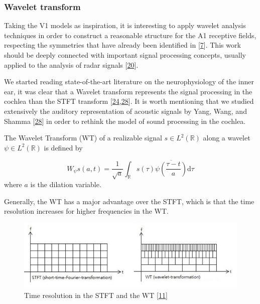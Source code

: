 \documentclass[
  american,
]{article}
\begin{document}
\hypertarget{wavelet-transform}{%
\subsubsection{Wavelet transform}\label{wavelet-transform}}

Taking the V1 models as inspiration, it is interesting to apply wavelet analysis techniques
in order to construct a reasonable structure for the A1 receptive fields,
respecting the symmetries that have already been identified in {[}\protect\hyperlink{ref-boscain2021}{7}{]}.
This work should be deeply connected with important signal processing concepts,
usually applied to the analysis of radar signals {[}\protect\hyperlink{ref-mann1992}{20}{]}.

We started reading state-of-the-art literature on the neurophysiology of the inner ear,
it was clear that a Wavelet transform represents the signal processing
in the cochlea than the STFT transform {[}\protect\hyperlink{ref-reimann2011}{24},\protect\hyperlink{ref-yang1992}{28}{]}.
It is worth mentioning that we studied extensively the auditory representation
of acoustic signals by Yang, Wang, and Shamma {[}\protect\hyperlink{ref-yang1992}{28}{]} in order
to rethink the model of sound processing in the cochlea.

The Wavelet Transform (WT) of a realizable signal \(s\in L^2(\mathbb{R})\) along
a wavelet \(\psi\in L^2(\mathbb{R})\) is defined by

\begin{equation}
W_\psi s(a,t) = \frac{1}{\sqrt{a}} \int_\mathbb{R}s(\tau) \overline{\psi\left(\frac{\tau-t}{a}\right)} \mathrm{d}\tau
\end{equation}
where \(a\) is the dilation variable.

Generally, the WT has a major advantage over the STFT, which is that the time resolution
increases for higher frequencies in the WT.

\begin{figure}
\centering
\includegraphics{img/stft_vs_wt.jpg}
\caption{Time resolution in the STFT and the WT {[}\protect\hyperlink{ref-stft_vs_wt}{11}{]}}
\end{figure}
\end{document}
